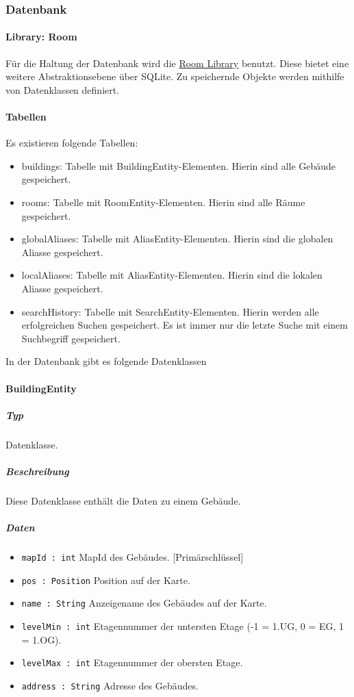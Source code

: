 \subsubsection{Datenbank}
\paragraph{Library: Room}
Für die Haltung der Datenbank wird die \href{https://developer.android.com/training/data-storage/room}
{Room Library} benutzt. Diese bietet eine weitere Abstraktionsebene über SQLite.
Zu speichernde Objekte werden mithilfe von Datenklassen definiert.

\paragraph{Tabellen}
Es existieren folgende Tabellen:
\begin{itemize}
    \item buildings: Tabelle mit BuildingEntity-Elementen. Hierin sind alle Gebäude gespeichert.
    \item rooms: Tabelle mit RoomEntity-Elementen. Hierin sind alle Räume gespeichert.
    \item globalAliases: Tabelle mit AliasEntity-Elementen. Hierin sind die globalen Aliasse gespeichert.
    \item localAliases: Tabelle mit AliasEntity-Elementen. Hierin sind die lokalen Aliasse gespeichert.
    \item searchHistory: Tabelle mit SearchEntity-Elementen. Hierin werden alle erfolgreichen Suchen gespeichert. 
    Es ist immer nur die letzte Suche mit einem Suchbegriff gespeichert.
\end{itemize}

In der Datenbank gibt es folgende Datenklassen

\paragraph{BuildingEntity}
\subparagraph*{Typ}
Datenklasse.
\subparagraph*{Beschreibung}
Diese Datenklasse enthält die Daten zu einem Gebäude.
\subparagraph*{Daten}
\begin{itemize}
    \item \texttt{mapId : int} MapId des Gebäudes. [Primärschlüssel]
    \item \texttt{pos : Position} Position auf der Karte.
    \item \texttt{name : String} Anzeigename des Gebäudes auf der Karte.
    \item \texttt{levelMin : int} Etagennummer der untersten Etage (-1 = 1.UG, 0 = EG, 1 = 1.OG).
    \item \texttt{levelMax : int} Etagennummer der obersten Etage.
    \item \texttt{address : String} Adresse des Gebäudes.
\end{itemize}

